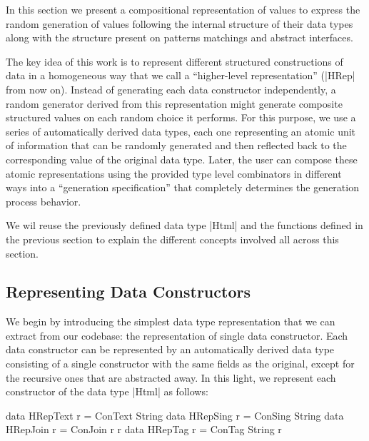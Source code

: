 In this section we present a compositional representation of values to express
the random generation of values following the internal structure of their data
types along with the structure present on patterns matchings and abstract
interfaces.


The key idea of this work is to represent different structured constructions of
data in a homogeneous way that we call a ``higher-level representation'' (|HRep|
from now on).
%
Instead of generating each data constructor independently, a random generator
derived from this representation might generate composite structured values on
each random choice it performs.
%
%
For this purpose, we use a series of automatically derived data types, each one
representing an atomic unit of information that can be randomly generated and
then reflected back to the corresponding value of the original data type.
%
Later, the user can compose these atomic representations using the provided type
level combinators in different ways into a ``generation specification'' that
completely determines the generation process behavior.


We wil reuse the previously defined data type |Html| and the functions defined
in the previous section to explain the different concepts involved all across
this section.


\subsection*{\textbf{Representing Data Constructors}}

We begin by introducing the simplest data type representation that we can
extract from our codebase: the representation of single data constructor.
%
Each data constructor can be represented by an automatically derived data type
consisting of a single constructor with the same fields as the original, except
for the recursive ones that are abstracted away.
%
In this light, we represent each constructor of the data type |Html| as follows:

\begin{code}
data HRepText  r = ConText  String
data HRepSing  r = ConSing  String
data HRepJoin  r = ConJoin  r r
data HRepTag   r = ConTag   String r
\end{code}

